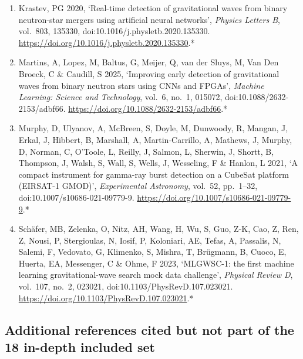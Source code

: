 \documentclass[11pt,a4paper]{article}
\begin{document}
\begin{enumerate}[label=\arabic*., leftmargin=2em]
\item Krastev, PG 2020, `Real-time detection of gravitational waves from binary neutron-star mergers using artificial neural networks', \textit{Physics Letters B}, vol.\ 803, 135330, doi:10.1016/j.physletb.2020.135330. \url{https://doi.org/10.1016/j.physletb.2020.135330}.*
\item Martins, A, Lopez, M, Baltus, G, Meijer, Q, van der Sluys, M, Van Den Broeck, C \& Caudill, S 2025, `Improving early detection of gravitational waves from binary neutron stars using CNNs and FPGAs', \textit{Machine Learning: Science and Technology}, vol.\ 6, no.\ 1, 015072, doi:10.1088/2632-2153/adbf66. \url{https://doi.org/10.1088/2632-2153/adbf66}.*
\item Murphy, D, Ulyanov, A, McBreen, S, Doyle, M, Dunwoody, R, Mangan, J, Erkal, J, Hibbert, B, Marshall, A, Martin-Carrillo, A, Mathews, J, Murphy, D, Norman, C, O'Toole, L, Reilly, J, Salmon, L, Sherwin, J, Shortt, B, Thompson, J, Walsh, S, Wall, S, Wells, J, Wesseling, F \& Hanlon, L 2021, `A compact instrument for gamma-ray burst detection on a CubeSat platform (EIRSAT-1 GMOD)', \textit{Experimental Astronomy}, vol.\ 52, pp.\ 1--32, doi:10.1007/s10686-021-09779-9. \url{https://doi.org/10.1007/s10686-021-09779-9}.*
\item Sch\"{a}fer, MB, Zelenka, O, Nitz, AH, Wang, H, Wu, S, Guo, Z-K, Cao, Z, Ren, Z, Nousi, P, Stergioulas, N, Iosif, P, Koloniari, AE, Tefas, A, Passalis, N, Salemi, F, Vedovato, G, Klimenko, S, Mishra, T, Br\"{u}gmann, B, Cuoco, E, Huerta, EA, Messenger, C \& Ohme, F 2023, `MLGWSC-1: the first machine learning gravitational-wave search mock data challenge', \textit{Physical Review D}, vol.\ 107, no.\ 2, 023021, doi:10.1103/PhysRevD.107.023021. \url{https://doi.org/10.1103/PhysRevD.107.023021}.*
\end{enumerate}

\subsection*{Additional references cited but not part of the 18 in-depth included set}
\end{document}
